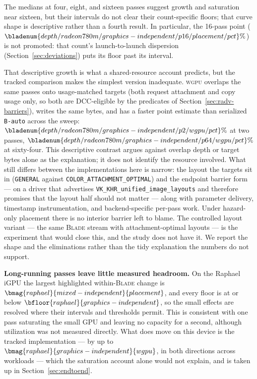 \documentclass[10pt,twocolumn]{article}
\newcommand{\blade}{\textsc{Blade}}
\newcommand{\wgpu}{\textsc{wgpu}}
\begin{document}
The medians at four, eight, and sixteen passes suggest growth and saturation
near sixteen, but their intervals do not clear their count-specific floors;
that curve shape is descriptive rather than a fourth result. In particular,
the 16-pass point
($\bladenum{depth/radeon780m/graphics-independent/p16/placement/pct}\%$)
is not promoted: that count's launch-to-launch dispersion
(Section~\ref{sec:deviations}) puts its floor past its interval.

That descriptive growth is what a shared-resource account predicts, but the
tracked comparison makes the simplest version inadequate. \wgpu{} overlaps the
same passes onto usage-matched targets (both request attachment and copy usage
only, so both are DCC-eligible by the predicates of
Section~\ref{sec:radv-barriers}), writes the same bytes, and has a faster point
estimate than serialized \texttt{B-auto} across the sweep:
$\bladenum{depth/radeon780m/graphics-independent/p2/wgpu/pct}\%$ at two
passes, $\bladenum{depth/radeon780m/graphics-independent/p64/wgpu/pct}\%$ at
sixty-four. This descriptive contrast argues against overlap depth or target
bytes alone as the explanation; it does not identify the resource involved.
What still differs between the implementations here is narrow: the layout the
targets sit in (\texttt{GENERAL} against
\texttt{COLOR\_ATTACHMENT\_OPTIMAL}) and the endpoint barrier form --- on a
driver that advertises \texttt{VK\_KHR\_unified\_image\_layouts} and
therefore promises that the layout half should not matter --- along with
parameter delivery, timestamp instrumentation, and backend-specific per-pass
work. Under hazard-only placement there is no interior barrier left to
blame. The controlled layout variant --- the same \blade{} stream with
attachment-optimal layouts --- is the experiment that would close this, and
the study does not have it. We report the shape and the eliminations rather
than the tidy explanation the numbers do not support.

\textbf{Long-running passes leave little measured headroom.} On the Raphael
iGPU the largest highlighted within-\blade{} change is
$\bmag{raphael}{mixed-independent}{placement}$, and every floor is at or below
$\bfloor{raphael}{graphics-independent}$, so the small effects are resolved
where their intervals and thresholds permit. This is
consistent with one pass saturating the small GPU and leaving no capacity for
a second, although utilization was not measured directly. What
does move on this device is the tracked implementation --- by up to
$\bmag{raphael}{graphics-independent}{wgpu}$, in both directions across
workloads --- which the saturation account alone would not explain, and is
taken up in Section~\ref{sec:endtoend}.
\end{document}
